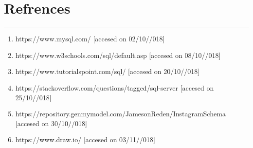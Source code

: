 \chapter{Refrences}\hrule
\label{Chapter:6}
\begin{enumerate}
	\item https://www.mysql.com/ [accesed on 02/10//018]
	\item https://www.w3schools.com/sql/default.asp [accesed on 08/10//018]
	\item https://www.tutorialspoint.com/sql/ [accesed on 20/10//018]
	\item https://stackoverflow.com/questions/tagged/sql-server [accesed on 25/10//018]
	\item https://repository.genmymodel.com/JamesonReden/InstagramSchema [accesed on 30/10//018]
	\item https://www.draw.io/ [accesed on 03/11//018]
\end{enumerate}